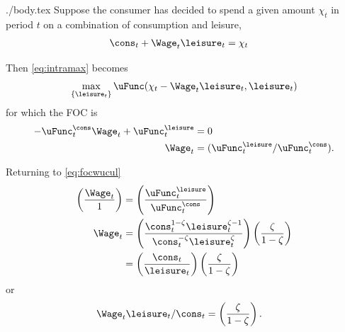 \documentclass{handout}
\begin{document}
\begin{verbatimwrite}{./body.tex}
Suppose the consumer has decided to spend a given amount $\chi_{t}$ in period $t$
on a combination of consumption and leisure,
\begin{equation}\begin{gathered}\begin{aligned}
        \cons_{t}+\Wage_{t}\leisure_{t} & =  \chi_{t}
\end{aligned}\end{gathered}\end{equation}

Then \eqref{eq:intramax} becomes
\begin{equation}
\max_{\{ \leisure_{t} \}} \uFunc(\chi_{t}-\Wage_{t}\leisure_{t},\leisure_{t})        
        \label{eq:intramax2}
\end{equation}
for which the FOC is
\begin{equation}\begin{gathered}\begin{aligned}
        - \uFunc^{\cons}_{t}\Wage_{t} + \uFunc_{t}^{\leisure } & =  0  
\\      \Wage_{t} & =  (\uFunc^{\leisure }_{t}/\uFunc_{t}^{\cons}).
\end{aligned}\end{gathered}\end{equation}

Returning to \eqref{eq:focwucul}
\begin{equation}\begin{gathered}\begin{aligned}
        \left(\frac{\Wage_{t}}{1}\right) & =  \left(\frac{\uFunc^{\leisure }_{t}}{\uFunc^{\cons}_{t}}\right)
\\ \Wage_{t} & =  \left(\frac{\cons_{t}^{1-\zeta}\leisure_{t}^{\zeta-1}}{\cons_{t}^{-\zeta}\leisure^{\zeta}_{t}}\right)\left(\frac{\zeta}{1-\zeta}\right)        
\\  & =  \left(\frac{\cons_{t}}{\leisure_{t}}\right)\left(\frac{\zeta}{1-\zeta}\right)   
\end{aligned}\end{gathered}\end{equation}
or
\begin{equation}\begin{gathered}\begin{aligned}
        \Wage_{t}\leisure_{t}/\cons_{t} & =  \left(\frac{\zeta}{1-\zeta}\right)      . \label{eq:wlc}
\end{aligned}\end{gathered}\end{equation}



\end{verbatimwrite}
\end{document}
